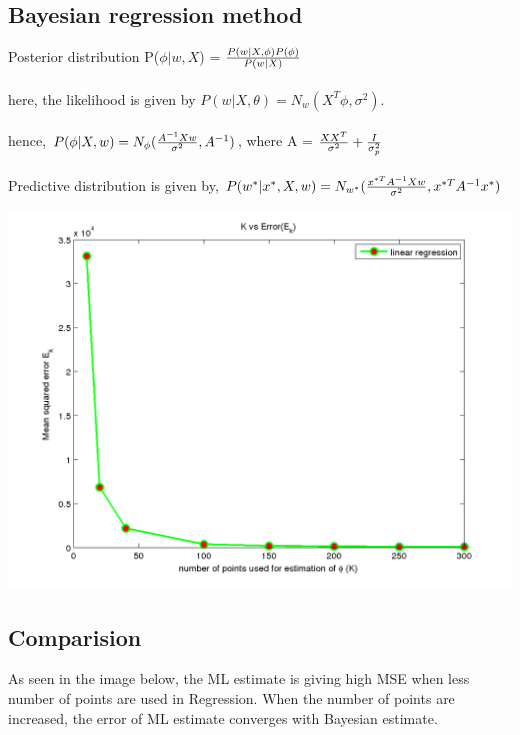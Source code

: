 \documentclass[fleqn]{article}
\begin{document}
\subsection{Bayesian regression method}

Posterior distribution P($\phi | w, X$) =  ${P(w|X,\phi) P(\phi)}\over{P(w|X)}$\\\\
here, the likelihood is given by $P(w|X, \theta) = N_w(X^T\phi, \sigma^2)$.\\\\
hence, $P(\phi|X,w) = N_{\phi}({{A^{-1}Xw} \over {\sigma^2}}, A^{-1})$, where A = ${{XX^T}\over{\sigma^2}} + {I\over\sigma_{p}^2}$ \\\\
Predictive distribution is given by, $P(w^*|x^*, X, w) = N_{w^*}({{x^{*T}A^{-1}Xw}\over{\sigma^2}}, {x^{*T}A^{-1}x^*})$

\includegraphics[scale=0.6]{./pics/task3/bayes_regression_error_vs_k.png}

\subsection{Comparision}
As seen in the image below, the ML estimate is giving high MSE when less number of points are used in Regression. 
When the number of points are increased, the error of ML estimate converges with Bayesian estimate.
\end{document}
